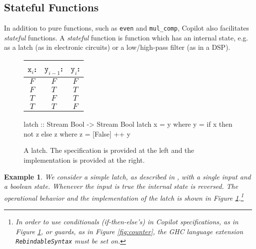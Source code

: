 \documentclass[]{article}
\theoremstyle{example}
\newtheorem{example}{Example}
\begin{document}
\subsection{Stateful Functions}

In addition to pure functions, such as {\tt even} and {\tt mul\_comp},
Copilot also facilitates \emph{stateful} functions. A \emph{stateful} function
is function which has an internal state, e.g. as a latch (as in electronic
circuits) or a low/high-pass filter (as in a DSP).

\begin{figure}
\begin{minipage}{0.4\linewidth}
\begin{tabular}{c|c||c}
$\mathtt{x}_i$: & $\mathtt{y}_{i-1}$: & $\mathtt{y}_i$:\\
\hline
$F$ & $F$ & $F$ \\
\hline
$F$ & $T$ & $T$ \\
\hline
$T$ & $F$ & $T$ \\
\hline
$T$ & $T$ & $F$
\end{tabular}
\end{minipage}
\hspace{1cm}
\begin{minipage}{0.6\linewidth}
\begin{code}
latch :: Stream Bool -> Stream Bool
latch x = y
  where
  y = if x then not z else z
    where
    z = [False] ++ y
\end{code}
\end{minipage}
\caption{A latch. The specification is provided at the left and the
implementation is provided at the right.}
\label{fig:jk_latch}
\end{figure}

\begin{example}
We consider a simple latch, as described in \cite{Farhat2004}, with a single
input and a boolean state. Whenever the input is true the internal state is reversed.
The operational behavior and the implementation of the latch is shown in Figure
\ref{fig:jk_latch}.\footnote
{In order
to use conditionals (if-then-else's) in Copilot specifications,
as in Figure \ref{fig:jk_latch},
or guards, as in Figure \ref{fig:counter}, the GHC
language extension {\tt RebindableSyntax} must be set on.}
\end{example}
\end{document}
